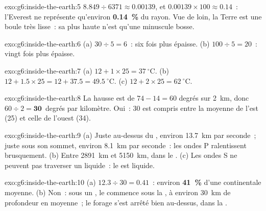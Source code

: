 \begin{solution}{exo:g6:inside-the-earth:5}
$8.849 \div 6371 \approx 0.00139$, et $0.00139 \times 100 \approx 0.14$~:
l'Everest ne représente qu'environ \textbf{0.14~\%} du rayon. Vue de
loin, la Terre est une boule très lisse~: sa plus haute  n'est
qu'une minuscule bosse.
\end{solution}

\begin{solution}{exo:g6:inside-the-earth:6}
(a) $30 \div 5 = 6$~: six fois plus épaisse. (b) $100 \div 5 = 20$~: vingt
fois plus épaisse.
\end{solution}

\begin{solution}{exo:g6:inside-the-earth:7}
(a) $12 + 1 \times 25 = 37~^\circ$C. (b) $12 + 1.5 \times 25 = 12 + 37.5 =
49.5~^\circ$C. (c) $12 + 2 \times 25 = 62~^\circ$C.
\end{solution}

\begin{solution}{exo:g6:inside-the-earth:8}
La hausse est de $74 - 14 = 60$ degrés sur 2~km, donc $60 \div 2 =
\textbf{30}$~degrés par kilomètre. Oui~: 30 est compris entre la moyenne
de l'est (25) et celle de l'ouest (34).
\end{solution}

\begin{solution}{exo:g6:inside-the-earth:9}
(a) Juste au-dessus du , environ 13.7~km par seconde~; juste sous son
sommet, environ 8.1~km par seconde~: les ondes P ralentissent brusquement.
(b) Entre 2891~km et 5150~km, dans le . (c) Les ondes S ne
peuvent pas traverser un liquide~: le  est liquide.
\end{solution}

\begin{solution}{exo:g6:inside-the-earth:10}
(a) $12.3 \div 30 = 0.41$~: environ \textbf{41~\%} d'une 
continentale moyenne. (b) Non~: sous un , le  commence
sous la , à environ 30~km de profondeur en moyenne~; le forage s'est
arrêté bien au-dessus, dans la .
\end{solution}

